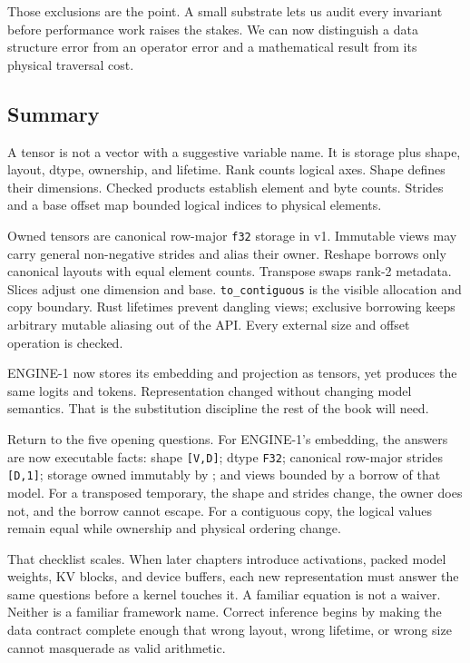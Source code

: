 \documentclass[
  10pt,
]{article}
\begin{document}
Those exclusions are the point. A small substrate lets us audit every
invariant before performance work raises the stakes. We can now
distinguish a data structure error from an operator error and a
mathematical result from its physical traversal cost.

\subsection{Summary}\label{summary-4}

A tensor is not a vector with a suggestive variable name. It is storage
plus shape, layout, dtype, ownership, and lifetime. Rank counts logical
axes. Shape defines their dimensions. Checked products establish element
and byte counts. Strides and a base offset map bounded logical indices
to physical elements.

Owned tensors are canonical row-major \texttt{f32} storage in v1.
Immutable views may carry general non-negative strides and alias their
owner. Reshape borrows only canonical layouts with equal element counts.
Transpose swaps rank-2 metadata. Slices adjust one dimension and base.
\texttt{to\_contiguous} is the visible allocation and copy boundary.
Rust lifetimes prevent dangling views; exclusive borrowing keeps
arbitrary mutable aliasing out of the API. Every external size and
offset operation is checked.

ENGINE-1 now stores its embedding and projection as tensors, yet
produces the same logits and tokens. Representation changed without
changing model semantics. That is the substitution discipline the rest
of the book will need.

Return to the five opening questions. For ENGINE-1's embedding, the
answers are now executable facts: shape \texttt{{[}V,D{]}}; dtype
\texttt{F32}; canonical row-major strides \texttt{{[}D,1{]}}; storage
owned immutably by \texttt{}; and views
bounded by a borrow of that model. For a transposed temporary, the shape
and strides change, the owner does not, and the borrow cannot escape.
For a contiguous copy, the logical values remain equal while ownership
and physical ordering change.

That checklist scales. When later chapters introduce activations, packed
model weights, KV blocks, and device buffers, each new representation
must answer the same questions before a kernel touches it. A familiar
equation is not a waiver. Neither is a familiar framework name. Correct
inference begins by making the data contract complete enough that wrong
layout, wrong lifetime, or wrong size cannot masquerade as valid
arithmetic.
\end{document}
